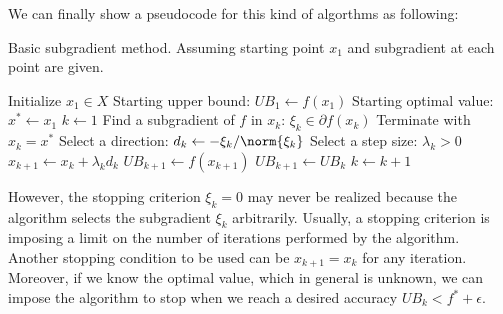 We can finally show a pseudocode for this kind of algorthms as following:
\begin{algorithm}[H]
    \caption{Basic subgradient method. Assuming starting point $x_1$ and subgradient at each point are given.}
	\label{alg:subalg}
	\begin{algorithmic}[1]
	    \State Initialize $\mathit{x_1} \in X$
	    \State Starting upper bound: $\mathit{UB}_1 \leftarrow f(x_1)$
	    \State Starting optimal value: $x^* \leftarrow x_1$
	    \State $k \leftarrow 1$
		\State Find a subgradient of $f$ in $x_k$: $\xi_k \in \partial f(x_k)$
		\State Terminate with $x_k = x^*$
		\EndIf
		\State Select a direction: $d_k \leftarrow -\xi_k/\norm{\xi_k}$
		\State Select a step size: $\lambda_k > 0$
		\State $x_{k+1} \leftarrow x_k + \lambda_k d_k$
            \State $\mathit{UB}_{k+1} \leftarrow f(x_{k+1})$
        \Else
            \State $\mathit{UB}_{k+1} \leftarrow \mathit{UB}_k$
		\EndIf
		\State $k \leftarrow k+1$
		\EndWhile
	\end{algorithmic}
\end{algorithm}
However, the stopping criterion $\xi_k = 0$ may never be realized because the algorithm selects the subgradient $\xi_k$ arbitrarily. Usually, a stopping criterion is imposing a limit on the number of iterations performed by the algorithm. Another stopping condition to be used can be $x_{k+1} = x_k$ for any iteration. Moreover, if we know the optimal value, which in general is unknown, we can impose the algorithm to stop when we reach a desired accuracy $\mathit{UB}_k < f^* + \epsilon$.



